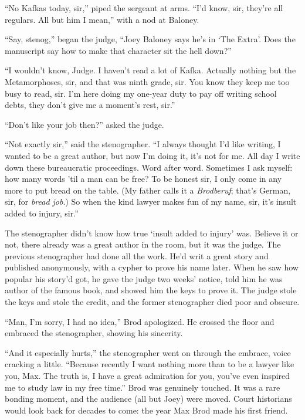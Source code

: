 \documentclass[oneside]{book}
\begin{document}
``No Kafkas today, sir,'' piped the sergeant at arms.  ``I'd know, sir, they're all regulars.
All but him I mean,'' with a nod at Baloney.

``Say, stenog,'' began the judge, ``Joey Baloney says he's in `The Extra'.  Does the manuscript
say how to make that character sit the hell down?''

``I wouldn't know, Judge.  I haven't read a lot of Kafka.  Actually nothing but the Metamorphoses, sir,
and that was ninth grade, sir.  You know they keep me too busy to read, sir.  I'm here doing my one-year
duty to pay off writing school debts, they don't give me a moment's rest, sir.''

``Don't like your job then?'' asked the judge.

``Not exactly sir,'' said the stenographer.
``I always thought I'd like writing, I wanted to be a great author, but now I'm doing it,
it's not for me.  All day I write down these bureaucratic proceedings.  Word after word.
Sometimes I ask myself: how many words 'til a man can be free?
To be honest sir, I only
come in any more to put bread on the table.  (My father calls it a \emph{Brodberuf}; that's
German, sir, for \emph{bread job}.)
So when the kind lawyer makes fun of my name, sir, it's insult added to
injury, sir.''

The stenographer didn't know how true `insult added to injury' was.
Believe it or not, there already was a great author in the room, but it
was the judge.  The previous stenographer had
done all the work.  He'd writ a great story and published anonymously,
with a cypher to prove his name later.  When he saw how popular his
story'd got, he gave the judge two
weeks' notice, told him he was author of the famous book, and showed him the
keys to prove it.  The judge stole the keys and stole the credit, and the
former stenographer died poor and obscure.

``Man, I'm sorry, I had no idea,'' Brod apologized.  He crossed the floor and embraced the stenographer,
showing his sincerity.


``And it especially hurts,'' the stenographer went on through the embrace, voice cracking a little.
``Because recently I want nothing more
than to be a lawyer like you, Max.  The truth is, I have a great admiration
for you, you've even inspired me to study law in my free time.''
Brod was genuinely touched.  It was a rare bonding moment, and the audience (all but Joey)
were moved.  Court historians would look back
for decades to come: the year Max Brod made his first friend.
\end{document}
